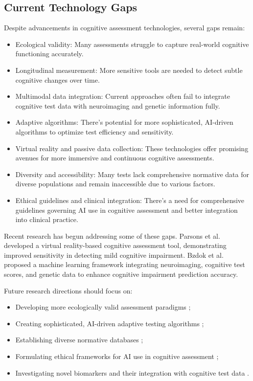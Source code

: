 \subsection{Current Technology Gaps}
Despite advancements in cognitive assessment technologies, several gaps remain:
\begin{itemize}
    \item Ecological validity: Many assessments struggle to capture real-world cognitive functioning accurately.
    \item Longitudinal measurement: More sensitive tools are needed to detect subtle cognitive changes over time.
    \item Multimodal data integration: Current approaches often fail to integrate cognitive test data with neuroimaging and genetic information fully.
    \item Adaptive algorithms: There's potential for more sophisticated, AI-driven algorithms to optimize test efficiency and sensitivity.
    \item Virtual reality and passive data collection: These technologies offer promising avenues for more immersive and continuous cognitive assessments.
    \item Diversity and accessibility: Many tests lack comprehensive normative data for diverse populations and remain inaccessible due to various factors.
    \item Ethical guidelines and clinical integration: There's a need for comprehensive guidelines governing AI use in cognitive assessment and better integration into clinical practice.
\end{itemize}

Recent research has begun addressing some of these gaps. Parsons et al. \cite{Parsons2021} developed a virtual reality-based cognitive assessment tool, demonstrating improved sensitivity in detecting mild cognitive impairment. Bzdok et al. \cite{Bzdok2020} proposed a machine learning framework integrating neuroimaging, cognitive test scores, and genetic data to enhance cognitive impairment prediction accuracy.

Future research directions should focus on:
\begin{itemize}
    \item Developing more ecologically valid assessment paradigms \cite{Parsons2021};
    \item Creating sophisticated, AI-driven adaptive testing algorithms \cite{Zorluoglu2020};
    \item Establishing diverse normative databases \cite{Gianfrancesco2018};
    \item Formulating ethical frameworks for AI use in cognitive assessment \cite{Birhane2021};
    \item Investigating novel biomarkers and their integration with cognitive test data \cite{Bzdok2020}.
\end{itemize}

